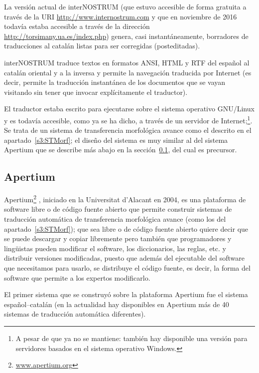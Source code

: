La versión actual de {\sf interNOSTRUM} (que estuvo accesible de forma gratuita a través de la URI \url{http://www.internostrum.com} y que en noviembre de 2016 todavía estaba accesible a través de la dirección \url{http://torsimany.ua.es/index.php}) genera, casi instantáneamente, borradores de traducciones al catalán listas para ser corregidas (posteditadas). 

{\sf interNOSTRUM} traduce textos en formatos ANSI, HTML y RTF del español al catalán oriental y a la inversa y permite la navegación traducida por Internet (es decir, permite la traducción instantánea de los documentos que se vayan visitando sin tener que invocar explícitamente el traductor). 

El traductor estaba escrito para ejecutarse sobre el sistema operativo GNU/Linux y es todavía accesible, como ya se ha dicho, a través de un servidor de Internet;\footnote{A pesar de que ya no se mantiene: también hay disponible una versión para servidores basados en el sistema operativo Windows.}. Se trata de un sistema de transferencia morfológica avance como el descrito en el apartado~\ref{s3:STMorf}; el diseño del sistema es muy similar al del sistema Apertium que se describe más abajo en la sección~\ref{ss:apertium}, del cual es precursor. 

\subsection{Apertium} \label{ss:apertium} 

Apertium\footnote{\url{www.apertium.org}} \citep{forcada2011apertium}, iniciado en la Universitat d'Alacant en 2004, es una plataforma de software libre o de código fuente abierto que permite construir sistemas de traducción automática de transferencia morfológica avance (como los del apartado~\ref{s3:STMorf}); que sea libre o de código fuente abierto quiere decir que se puede descargar y copiar libremente pero también que programadores y lingüistas pueden modificar el software, los diccionarios, las reglas, etc. y distribuir versiones modificadas, puesto que además del ejecutable del software que necesitamos para usarlo, se  distribuye el código fuente, es decir, la forma del software que permite a los expertos modificarlo. 

El primer sistema que se construyó sobre la plataforma Apertium fue el sistema español--catalán (en la actualidad hay disponibles en Apertium más de 40 sistemas de traducción automática diferentes). 

